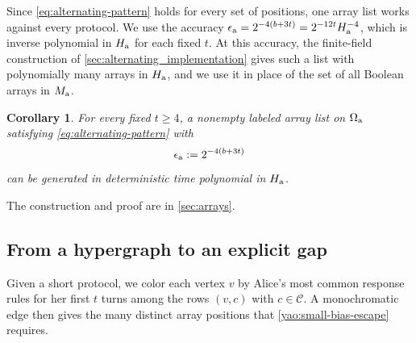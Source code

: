 \documentclass[11pt,letterpaper]{article} \usepackage[utf8]{inputenc}
\theoremstyle{plain} \newtheorem{theorem}{Theorem}[section]
\newtheorem{corollary}[corollary]{Corollary} \aliascntresetthe{corollary}
\theoremstyle{definition} \newaliascnt{definition}{theorem}
\begin{document}
Since \cref{eq:alternating-pattern} holds for every set of positions, one
array list works against every protocol.
We use the accuracy
$\epsilon_{\rm a}=2^{-4(b+3t)}=2^{-12t}H_{\rm a}^{-4}$, which is inverse
polynomial in $H_{\rm a}$ for each fixed $t$. At this accuracy, the
finite-field construction of \cref{sec:alternating_implementation} gives such a
list with polynomially many arrays in $H_{\rm a}$, and we use it in place of the
set of all Boolean arrays in $M_{\rm a}$.

\begin{corollary}\label{yao:array-list}
For every fixed $t\ge4$, a nonempty labeled array list on $\Omega_{\rm a}$
satisfying \cref{eq:alternating-pattern} with
\[
\epsilon_{\rm a}:=2^{-4(b+3t)}
\]
can be generated in deterministic time polynomial in $H_{\rm a}$.
\end{corollary}

The construction and proof are in \cref{sec:arrays}.

\subsection{From a hypergraph to an explicit gap}

Given a short protocol, we color each vertex $v$ by Alice's most common response
rules for her first $t$ turns among the rows $(v,c)$ with $c\in\mathcal C$. A monochromatic edge then gives the many distinct
array positions that \cref{yao:small-bias-escape} requires.
\end{document}
